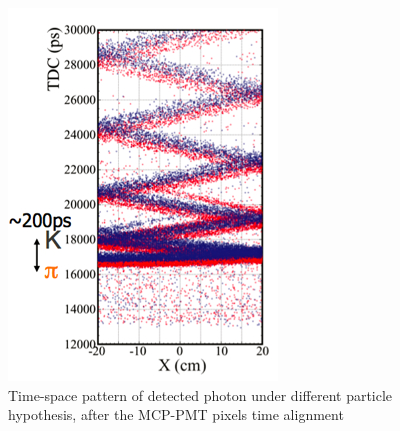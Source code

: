 \documentclass[a4paper,11pt]{article}
\begin{document}
\begin{figure}[t]
\begin{minipage}{0.4\textwidth}
\includegraphics[width=\textwidth]{pictures/iTOP_pattern}
\caption{Time-space pattern of detected photon under different particle hypothesis, after the MCP-PMT pixels time alignment}
\label{fig:PID}
\end{minipage}
\end{figure}
\end{document}
